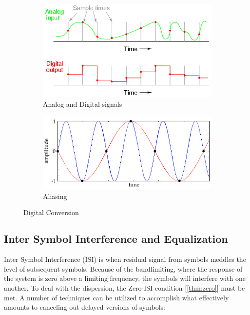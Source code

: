 \documentclass[]{article}
\begin{document}
\begin{figure}[h]
        \centering
        \begin{subfigure}[b]{0.4\textwidth}
                \includegraphics[width=\textwidth]{digitization.png}
                \caption{Analog and Digital signals}
                \label{fig:digitization}
        \end{subfigure}%
        \qquad \quad %
        \begin{subfigure}[b]{0.5\textwidth}
                \includegraphics[width=\textwidth]{aliasing.jpg}
                \caption{Aliasing \label{fig:alias}}
                \label{fig:alias}
        \end{subfigure}
        \caption{Digital Conversion \label{fig:digitize}}
\end{figure}

\newpage
\subsection{Inter Symbol Interference and Equalization}
\label{app:ISIbackground}
Inter Symbol Interference (ISI) is when residual signal from symbols meddles the level of subsequent symbols.  Because of the bandlimiting, where the response of the system is zero above a limiting frequency, the symbols will interfere with one another. To deal with the dispersion, the Zero-ISI condition [\ref{thm:zero}] must be met.  A number of techniques can be utilized to accomplish what effectively amounts to canceling out delayed versions of symbols:
\end{document}
